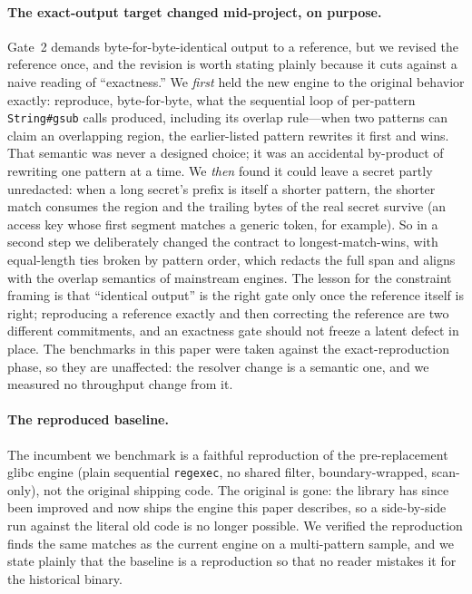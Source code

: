 \documentclass[acmsmall,nonacm,screen]{acmart}
\begin{document}
\paragraph{The exact-output target changed mid-project, on purpose.} Gate~2 demands
byte-for-byte-identical output to a reference, but we revised the reference once,
and the revision is worth stating plainly because it cuts against a naive reading of
``exactness.'' We \emph{first} held the new engine to the original behavior exactly:
reproduce, byte-for-byte, what the sequential loop of per-pattern
\texttt{String\#gsub} calls produced, including its overlap rule---when two patterns
can claim an overlapping region, the earlier-listed pattern rewrites it first and
wins. That semantic was never a designed choice; it was an accidental by-product of
rewriting one pattern at a time. We \emph{then} found it could leave a secret
partly unredacted: when a long secret's prefix is itself a shorter pattern, the
shorter match consumes the region and the trailing bytes of the real secret survive
(an access key whose first segment matches a generic token, for example). So in a
second step we deliberately changed the contract to longest-match-wins, with
equal-length ties broken by pattern order, which redacts the full span and aligns
with the overlap semantics of mainstream engines. The lesson for the constraint
framing is that ``identical output'' is the right gate only once the reference
itself is right; reproducing a reference exactly and then correcting the reference
are two different commitments, and an exactness gate should not freeze a latent
defect in place. The benchmarks in this paper were taken against the
exact-reproduction phase, so they are unaffected: the resolver change is a
semantic one, and we measured no throughput change from it.

\paragraph{The reproduced baseline.} The incumbent we benchmark is a faithful
reproduction of the pre-replacement glibc engine (plain sequential
\texttt{regexec}, no shared filter, boundary-wrapped, scan-only), not the original
shipping code. The original is gone: the library has since been improved and now
ships the engine this paper describes, so a side-by-side run against the literal old
code is no longer possible. We verified the reproduction finds the same matches as
the current engine on a multi-pattern sample, and we state plainly that the baseline
is a reproduction so that no reader mistakes it for the historical binary.
\end{document}
